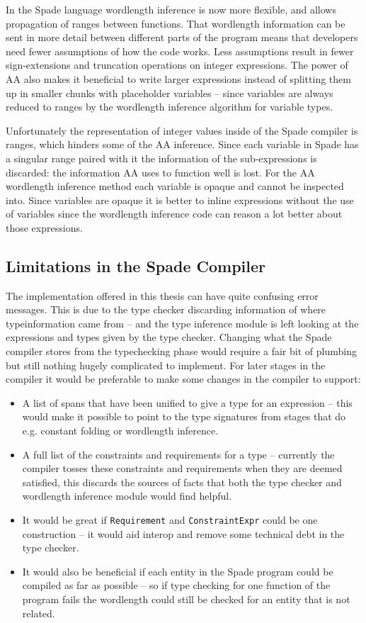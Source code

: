 In the Spade language wordlength inference is now more flexible, and allows propagation of ranges between functions. That wordlength information can be sent in more detail between different parts of the program means that developers need fewer assumptions of how the code works. Less assumptions result in fewer sign-extensions and truncation operations on integer expressions. The power of AA also makes it beneficial to write larger expressions instead of splitting them up in smaller chunks with placeholder variables -- since variables are always reduced to ranges by the wordlength inference algorithm for variable types.

Unfortunately the representation of integer values inside of the Spade compiler is ranges, which hinders some of the AA inference. Since each variable in Spade has a singular range paired with it the information of the sub-expressions is discarded: the information AA uses to function well is lost. For the AA wordlength inference method each variable is opaque and cannot be inspected into. Since variables are opaque it is better to inline expressions without the use of variables since the wordlength inference code can reason a lot better about those expressions.

\subsection{Limitations in the Spade Compiler}
The implementation offered in this thesis can have quite confusing error messages. This is due to the type checker discarding information of where typeinformation came from -- and the type inference module is left looking at the expressions and types given by the type checker. Changing what the Spade compiler stores from the typechecking phase would require a fair bit of plumbing but still nothing hugely complicated to implement. For later stages in the compiler it would be preferable to make some changes in the compiler to support:
\begin{itemize}
  \item A list of spans that have been unified to give a type for an expression -- this would make it possible to point to the type signatures from stages that do e.g. constant folding or wordlength inference.
  \item A full list of the constraints and requirements for a type -- currently the compiler tosses these constraints and requirements when they are deemed satisfied, this discards the sources of facts that both the type checker and wordlength inference module would find helpful.
  \item It would be great if \verb+Requirement+ and \verb+ConstraintExpr+ could be one construction -- it would aid interop and remove some technical debt in the type checker.
  \item It would also be beneficial if each entity in the Spade program could be compiled as far as possible -- so if type checking for one function of the program fails the wordlength could still be checked for an entity that is not related.
\end{itemize}


